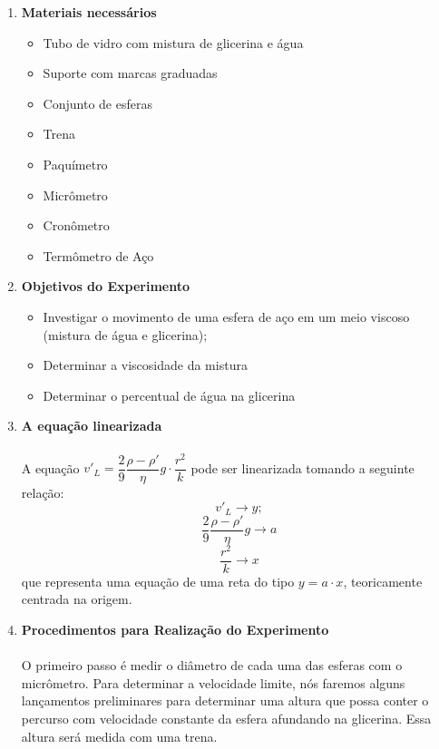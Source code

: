 \documentclass[a4paper, 11pt]{article}
\begin{document}
\begin{enumerate}
	\item \textbf{Materiais necessários}
		\begin{itemize}
		\item Tubo de vidro com mistura de glicerina e água
		\item Suporte com marcas graduadas
		\item Conjunto de esferas
		\item Trena
		\item Paquímetro
		\item Micrômetro
		\item Cronômetro
		\item Termômetro de Aço
		\\
		\end{itemize}

	\item \textbf{Objetivos do Experimento}
		\begin{itemize}
		\item Investigar o movimento de uma esfera de aço em um meio viscoso (mistura de água e glicerina);
		\item Determinar a viscosidade da mistura
		\item Determinar o percentual de água na glicerina
		\\
		\end{itemize}

	\item \textbf{A equação linearizada}
	\paragraph{}
	A equação $v'_L = \dfrac{2}{9} \dfrac{\rho - \rho'}{\eta} g \cdot \dfrac{r^2}{k}$ pode ser linearizada tomando a seguinte relação:
$$ v'_L \longrightarrow y; $$
$$ \dfrac{2}{9} \dfrac{\rho - \rho'}{\eta} g \longrightarrow a $$
$$ \dfrac{r^2}{k} \longrightarrow x $$
que representa uma equação de uma reta do tipo $y = a \cdot x$, teoricamente centrada na origem.
\\

	\item \textbf{Procedimentos para Realização do Experimento}
	\paragraph{}
O primeiro passo é medir o diâmetro de cada uma das esferas com o micrômetro. Para determinar a velocidade limite, nós faremos alguns lançamentos preliminares para determinar uma altura que possa conter o percurso com velocidade constante da esfera afundando na glicerina. Essa altura será medida com uma trena. 

\end{enumerate}
\end{document}
